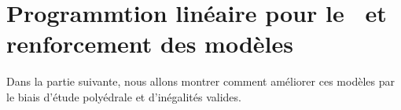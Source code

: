 \chapter[Modèles pour le \CECSP~et renforcement des modèles]{Programmtion linéaire pour le \CECSP~et renforcement des modèles}







Dans la partie suivante, nous allons montrer comment améliorer ces
modèles par le biais d'étude polyédrale et d'inégalités valides.




